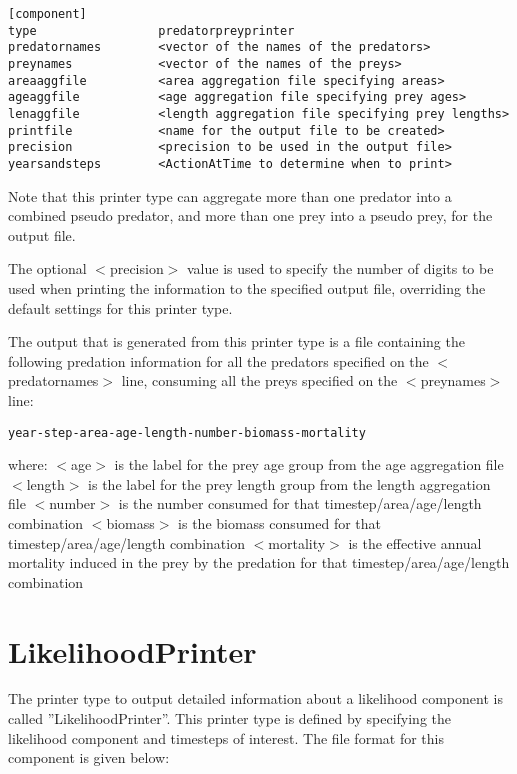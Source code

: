 \documentclass[10pt,twoside]{book}
\begin{document}
{\small\begin{verbatim}
[component]
type                 predatorpreyprinter
predatornames        <vector of the names of the predators>
preynames            <vector of the names of the preys>
areaaggfile          <area aggregation file specifying areas>
ageaggfile           <age aggregation file specifying prey ages>
lenaggfile           <length aggregation file specifying prey lengths>
printfile            <name for the output file to be created>
precision            <precision to be used in the output file>
yearsandsteps        <ActionAtTime to determine when to print>
\end{verbatim}}

Note that this printer type can aggregate more than one predator into a combined pseudo predator, and more than one prey into a pseudo prey, for the output file.

\bigskip
The optional $<$precision$>$ value is used to specify the number of digits to be used when printing the information to the specified output file, overriding the default settings for this printer type.

\bigskip
The output that is generated from this printer type is a file containing the following predation information for all the predators specified on the $<$predatornames$>$ line, consuming all the preys specified on the $<$preynames$>$ line:

{\small\begin{verbatim}
year-step-area-age-length-number-biomass-mortality
\end{verbatim}}

where:\newline
$<$age$>$ is the label for the prey age group from the age aggregation file\newline
$<$length$>$ is the label for the prey length group from the length aggregation file\newline
$<$number$>$ is the number consumed for that timestep/area/age/length combination\newline
$<$biomass$>$ is the biomass consumed for that timestep/area/age/length combination\newline
$<$mortality$>$ is the effective annual mortality induced in the prey by the predation for that timestep/area/age/length combination

\section{LikelihoodPrinter}\label{sec:likelihoodprinter}
The printer type to output detailed information about a likelihood component is called ''LikelihoodPrinter''.  This printer type is defined by specifying the likelihood component and timesteps of interest.  The file format for this component is given below:
\end{document}
